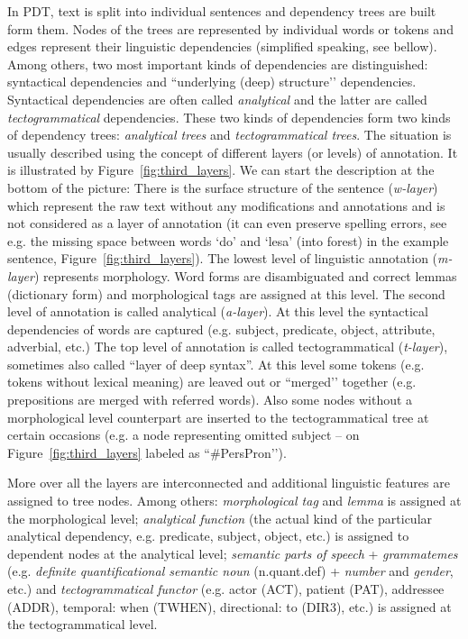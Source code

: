 In PDT, text is split into individual sentences and dependency trees are built form them. Nodes of the trees are represented by individual words or tokens and edges represent their linguistic dependencies (simplified speaking, see bellow). Among others, two most important kinds of dependencies are distinguished: syntactical dependencies and ``underlying (deep) structure’’ dependencies. Syntactical dependencies are often called \emph{analytical} and the latter are called \emph{tectogrammatical} dependencies. These two kinds of dependencies form two kinds of dependency trees: \emph{analytical trees} and \emph{tectogrammatical trees}. The situation is usually described using the concept of different layers (or levels) of annotation. It is illustrated by Figure~\ref{fig:third_layers}. 
We can start the description at the bottom of the picture: There is the surface structure of the sentence (\emph{w-layer}) which represent the raw text without any modifications and annotations and is not considered as a layer of annotation (it can even preserve spelling errors, see e.g. the missing space between words `do' and `lesa' (into forest) in the example sentence, Figure~\ref{fig:third_layers}).
The lowest level of linguistic annotation (\emph{m-layer}) represents morphology. Word forms are disambiguated and correct lemmas (dictionary form) and morphological tags are assigned at this level. The second level of annotation is called analytical (\emph{a-layer}). At this level the syntactical dependencies of words are captured (e.g. subject, predicate, object, attribute, adverbial, etc.) The top level of annotation is called tectogrammatical (\emph{t-layer}), sometimes also called ``layer of deep syntax''. At this level some tokens (e.g. tokens without lexical meaning) are leaved out or ``merged’’ together (e.g. prepositions are merged with referred words). Also some nodes without a morphological level counterpart are inserted to the tectogrammatical tree at certain occasions (e.g. a node representing omitted subject -- on Figure~\ref{fig:third_layers} labeled as ``\#PersPron’’).  

More over all the layers are interconnected and additional linguistic features are assigned to tree nodes. Among others: \emph{morphological tag} and \emph{lemma} is assigned at the morphological level; \emph{analytical function} (the actual kind of the particular analytical dependency, e.g. predicate, subject, object, etc.) is assigned to dependent nodes at the analytical level; \emph{semantic parts of speech} + \emph{grammatemes} (e.g. \emph{definite quantificational semantic noun} (n.quant.def) + \emph{number} and \emph{gender}, etc.) and \emph{tectogrammatical functor} (e.g. actor (ACT), patient (PAT), addressee (ADDR), temporal: when (TWHEN), directional: to (DIR3), etc.) is assigned at the tectogrammatical level. 

